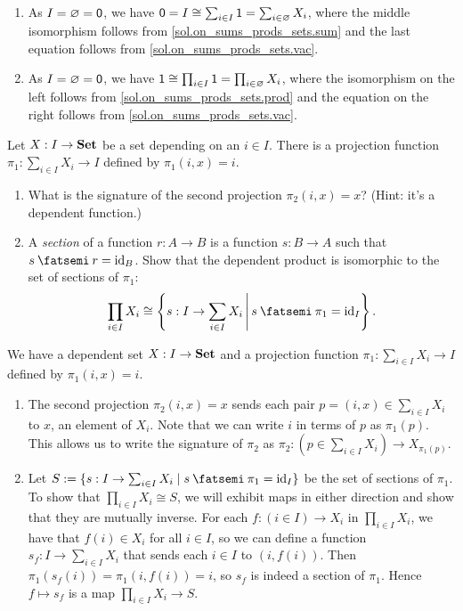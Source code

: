 \documentclass[Book-Poly]{subfiles}
\begin{document}
\begin{exercise}
\begin{solution}
\begin{enumerate}[resume]
    \item As $I = \varnothing = \textsf{0}$, we have $\textsf{0} = I \cong \sum_{i \in I} \textsf{1} = \sum_{i \in \varnothing} X_i$, where the middle isomorphism follows from \cref{sol.on_sums_prods_sets.sum} and the last equation follows from \cref{sol.on_sums_prods_sets.vac}.
    
    \item As $I = \varnothing = \textsf{0}$, we have $\textsf{1} \cong \prod_{i \in I} \textsf{1} = \prod_{i \in \varnothing} X_i$, where the isomorphism on the left follows from \cref{sol.on_sums_prods_sets.prod} and the equation on the right follows from \cref{sol.on_sums_prods_sets.vac}.
\end{enumerate}
\end{solution}
\end{exercise}

\begin{exercise}\label{exc.dependent_product_as_sections}
  Let $X : I \to \mathbf{Set}$ be a set depending on an $i \in I$. There is a
  projection function
  $\pi_1 : \sum_{i \in I} X_i \to I$
  defined by $\pi_1(i, x) = i$.
  \begin{enumerate}
    \item What is the signature of the second projection $\pi_2(i, x) = x$?
    (Hint: it's a dependent function.)
    \item A \emph{section} of a function $r : A \to B$ is a function $s : B \to A$ such that $s \then r = \id_B$.
    Show that the dependent product is isomorphic to the set of sections of $\pi_1$:
    \[\prod_{i \in I} X_i \cong \left\{s : I \to \sum_{i \in I} X_i \,\middle|\, s \then \pi_1 = \id_I\right\}.\]
    \qedhere
  \end{enumerate}
\begin{solution}
We have a dependent set $X : I \to \mathbf{Set}$ and a projection function $\pi_1 : \sum_{i \in I} X_i \to I$ defined by $\pi_1(i, x) = i$.
\begin{enumerate}
    \item The second projection $\pi_2(i, x) = x$ sends each pair $p = (i, x) \in \sum_{i \in I} X_i$ to $x$, an element of $X_i$.
    Note that we can write $i$ in terms of $p$ as $\pi_1(p)$.
    This allows us to write the signature of $\pi_2$ as $\pi_2 \colon (p \in \sum_{i \in I} X_i) \to X_{\pi_1(p)}$.
    
    \item Let $S := \{s : I \to \sum_{i \in I} X_i \mid s \then \pi_1 = \id_I\}$ be the set of sections of $\pi_1$. To show that $\prod_{i \in I} X_i \cong S$, we will exhibit maps in either direction and show that they are mutually inverse.
    For each $f \colon (i \in I) \to X_i$ in $\prod_{i \in I} X_i$, we have that $f(i) \in X_i$ for all $i \in I$, so we can define a function $s_f \colon I \to \sum_{i \in I} X_i$ that sends each $i \in I$ to $(i, f(i))$.
    Then $\pi_1(s_f(i)) = \pi_1(i, f(i)) = i$, so $s_f$ is indeed a section of $\pi_1$.
    Hence $f \mapsto s_f$ is a map $\prod_{i \in I} X_i \to S$.
    

\end{enumerate}
\end{solution}
\end{exercise}
\end{document}
